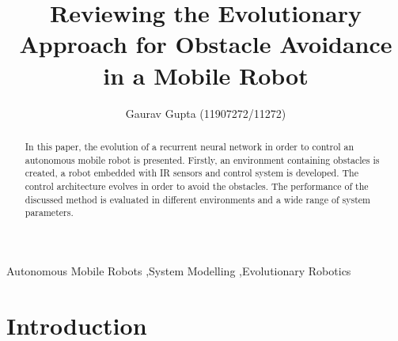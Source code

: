 \documentclass[12pt]{elsarticle}
\begin{document}
\begin{frontmatter}


\title{Reviewing the Evolutionary Approach for Obstacle Avoidance in a Mobile Robot}




\author{Gaurav Gupta (11907272/11272)}

\address{Department of Mechanical Engineering, IIT Kanpur}

\begin{abstract}
In this paper, the evolution of a recurrent neural network in order to control an autonomous mobile robot is presented. Firstly, an environment containing obstacles is created, a robot embedded with IR sensors and control system is developed. The control architecture evolves in order to avoid the obstacles. The performance of the discussed method is evaluated in different environments and a wide range of system parameters.
\end{abstract}
\begin{keyword}
Autonomous Mobile Robots \sep System Modelling \sep Evolutionary Robotics


\end{keyword}

\end{frontmatter}

\section{Introduction}
\label{S:1}
\end{document}
